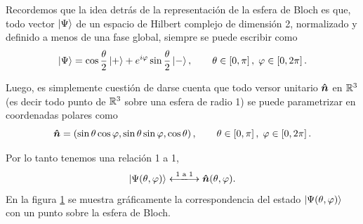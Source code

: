 \documentclass[10pt, a4paper]{article}
\numberwithin{equation}{subsection}
\begin{document}
\bigbreak

\begin{figure}
  \begin{minipage}[t]{0.5\textwidth}
    \vspace{0pt}
    \def\svgwidth{0.85\linewidth}
    
  \end{minipage}%
  \begin{minipage}[t]{0.5\textwidth}
    \vspace{10pt}
    \label{fig:def_bloch}
  \end{minipage}
\end{figure}

Recordemos que la idea detrás de la representación de la esfera de Bloch es
que, todo vector $\ket{\Psi}$ de un espacio de Hilbert complejo de dimensión 2,
normalizado y definido a menos de una fase global, siempre se puede escribir
como
\begin{equation} \label{eq:def_psi_bloch}
  \ket{\Psi} = \cos\frac{\theta}{2}\ket{+} +
  e^{i\varphi}\sin\frac{\theta}{2}\ket{-},
  \qquad\theta\in\left[0,\pi\right],\;\varphi\in\left[0,2\pi\right].
\end{equation}

Luego, es simplemente cuestión de darse cuenta que todo versor unitario
$\vu*{n}$ en $\mathbb{R}^3$ (es decir todo punto de $\mathbb{R}^3$ sobre una esfera de
radio 1) se puede parametrizar en coordenadas polares como
\begin{equation}
  \vu*{n} = \left(\sin\theta\cos\varphi, \sin\theta\sin\varphi,
  \cos\theta\right),
  \qquad\theta\in\left[0,\pi\right],\;\varphi\in\left[0,2\pi\right].
\end{equation}

Por lo tanto tenemos una relación 1 a 1,
\begin{equation}
  \ket{\Psi(\theta,\varphi)}
  \xlongleftrightarrow{\text{  1 a 1  }}
  \vers{n}(\theta,\varphi).
\end{equation}
En la figura \ref{fig:def_bloch} se muestra gráficamente la correspondencia del
estado $\ket{\Psi(\theta,\varphi)}$ con un punto sobre la esfera de Bloch.
\end{document}
